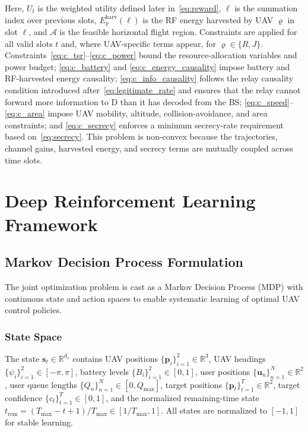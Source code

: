 \documentclass[journal]{IEEEtran}
\begin{document}
Here, $U_t$ is the weighted utility defined later in~\eqref{eq:reward}, $\ell$ is the summation index over previous slots, $E_{\varrho}^{\text{harv}}(\ell)$ is the RF energy harvested by UAV $\varrho$ in slot $\ell$, and $\mathcal{A}$ is the feasible horizontal flight region. Constraints are applied for all valid slots $t$ and, where UAV-specific terms appear, for $\varrho\in\{R,J\}$. Constraints~\eqref{eq:c_tsr}--\eqref{eq:c_power} bound the resource-allocation variables and power budget; \eqref{eq:c_battery} and \eqref{eq:c_energy_causality} impose battery and RF-harvested energy causality; \eqref{eq:c_info_causality} follows the relay causality condition introduced after~\eqref{eq:legitimate_rate} and ensures that the relay cannot forward more information to D than it has decoded from the BS; \eqref{eq:c_speed}--\eqref{eq:c_area} impose UAV mobility, altitude, collision-avoidance, and area constraints; and \eqref{eq:c_secrecy} enforces a minimum secrecy-rate requirement based on~\eqref{eq:secrecy}. This problem is non-convex because the trajectories, channel gains, harvested energy, and secrecy terms are mutually coupled across time slots.

\section{Deep Reinforcement Learning Framework}
\label{sec:drl}

\subsection{Markov Decision Process Formulation}
The joint optimization problem is cast as a Markov Decision Process (MDP) with continuous state and action spaces to enable systematic learning of optimal UAV control policies.

\subsubsection{State Space}
The state $\mathbf{s}_t \in \mathbb{R}^{d_s}$ contains UAV positions $\{\mathbf{p}_{i}\}_{i=1}^2 \in \mathbb{R}^3$, UAV headings $\{\psi_i\}_{i=1}^2 \in [-\pi, \pi]$, battery levels $\{B_i\}_{i=1}^2 \in [0, 1]$, user positions $\{\mathbf{u}_n\}_{n=1}^N \in \mathbb{R}^2$, user queue lengths $\{Q_n\}_{n=1}^N \in [0, Q_{\max}]$, target positions $\{\mathbf{p}_t\}_{t=1}^T \in \mathbb{R}^2$, target confidence $\{c_t\}_{t=1}^T \in [0, 1]$, and the normalized remaining-time state $t_{\mathrm{rem}}=(T_{\max}-t+1)/T_{\max}\in[1/T_{\max},1]$. All states are normalized to $[-1, 1]$ for stable learning.
\end{document}
